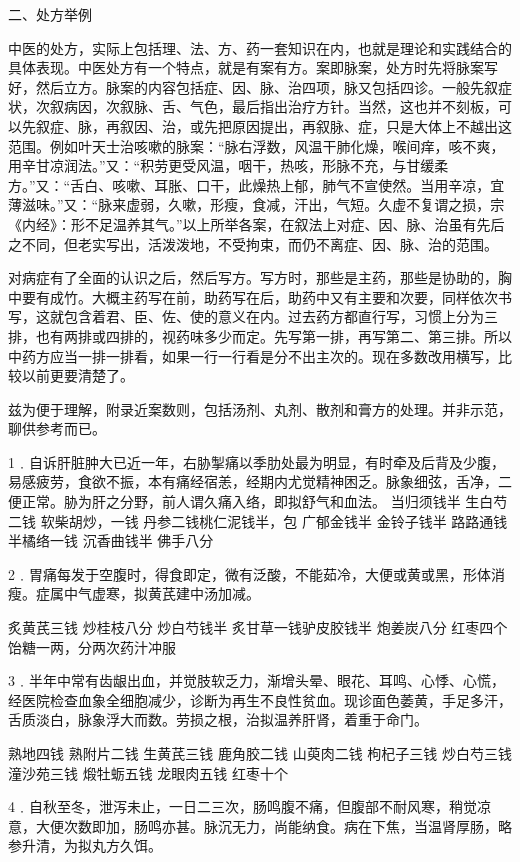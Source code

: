 \documentclass[a4paper,12pt,UTF8,twoside]{ctexbook}
\begin{document}
二、处方举例

中医的处方，实际上包括理、法、方、药一套知识在内，也就是理论和实践结合的具体表现。中医处方有一个特点，就是有案有方。案即脉案，处方时先将脉案写好，然后立方。脉案的内容包括症、因、脉、治四项，脉又包括四诊。一般先叙症状，次叙病因，次叙脉、舌、气色，最后指出治疗方针。当然，这也并不刻板，可以先叙症、脉，再叙因、治，或先把原因提出，再叙脉、症，只是大体上不越出这范围。例如叶天士治咳嗽的脉案：“脉右浮数，风温干肺化燥，喉间痒，咳不爽，用辛甘凉润法。”又：“积劳更受风温，咽干，热咳，形脉不充，与甘缓柔方。”又：“舌白、咳嗽、耳胀、口干，此燥热上郁，肺气不宣使然。当用辛凉，宜薄滋味。”又：“脉来虚弱，久嗽，形瘦，食减，汗出，气短。久虚不复谓之损，宗《内经》：形不足温养其气。”以上所举各案，在叙法上对症、因、脉、治虽有先后之不同，但老实写出，活泼泼地，不受拘束，而仍不离症、因、脉、治的范围。

对病症有了全面的认识之后，然后写方。写方时，那些是主药，那些是协助的，胸中要有成竹。大概主药写在前，助药写在后，助药中又有主要和次要，同样依次书写，这就包含着君、臣、佐、使的意义在内。过去药方都直行写，习惯上分为三排，也有两排或四排的，视药味多少而定。先写第一排，再写第二、第三排。所以中药方应当一排一排看，如果一行一行看是分不出主次的。现在多数改用横写，比较以前更要清楚了。

兹为便于理解，附录近案数则，包括汤剂、丸剂、散剂和膏方的处理。并非示范，聊供参考而已。

1﹒自诉肝脏肿大已近一年，右胁掣痛以季肋处最为明显，有时牵及后背及少腹，易感疲劳，食欲不振，本有痛经宿恙，经期内尤觉精神困乏。脉象细弦，舌净，二便正常。胁为肝之分野，前人谓久痛入络，即拟舒气和血法。
当归须钱半 生白芍二钱 软柴胡炒，一钱 丹参二钱桃仁泥钱半，包 广郁金钱半 金铃子钱半 路路通钱半橘络一钱 沉香曲钱半 佛手八分

2﹒胃痛每发于空腹时，得食即定，微有泛酸，不能茹冷，大便或黄或黑，形体消瘦。症属中气虚寒，拟黄芪建中汤加减。

炙黄芪三钱 炒桂枝八分 炒白芍钱半 炙甘草一钱驴皮胶钱半 炮姜炭八分 红枣四个 饴糖一两，分两次药汁冲服

3﹒半年中常有齿龈出血，并觉肢软乏力，渐增头晕、眼花、耳鸣、心悸、心慌，经医院检查血象全细胞减少，诊断为再生不良性贫血。现诊面色萎黄，手足多汗，舌质淡白，脉象浮大而数。劳损之根，治拟温养肝肾，着重于命门。

熟地四钱 熟附片二钱 生黄芪三钱 鹿角胶二钱 山萸肉二钱 枸杞子三钱 炒白芍三钱 潼沙苑三钱 煅牡蛎五钱 龙眼肉五钱 红枣十个

4﹒自秋至冬，泄泻未止，一日二三次，肠鸣腹不痛，但腹部不耐风寒，稍觉凉意，大便次数即加，肠鸣亦甚。脉沉无力，尚能纳食。病在下焦，当温肾厚肠，略参升清，为拟丸方久饵。
\end{document}
